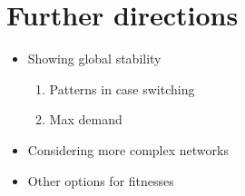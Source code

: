\documentclass[10pt]{beamer}
\begin{document}
\section{Further directions}

\begin{frame}

\begin{itemize}
\item Showing global stability
	\begin{enumerate}
	
	\item Patterns in case switching	
	
	\item Max demand 	
	
	\end{enumerate}
	
\item Considering more complex networks

\item Other options for fitnesses

\end{itemize}

\end{frame}
\end{document}
